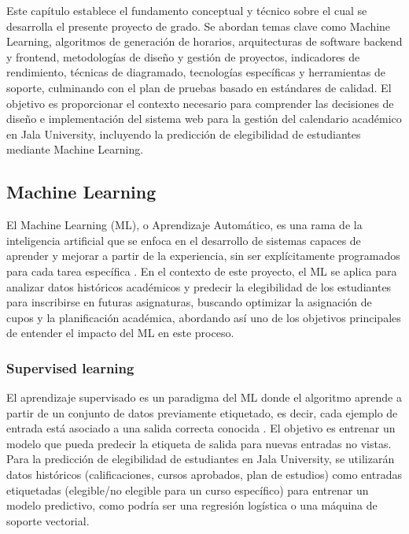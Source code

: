 Este capítulo establece el fundamento conceptual y técnico sobre el cual se desarrolla el presente proyecto de grado. Se abordan temas clave como Machine Learning, algoritmos de generación de horarios, arquitecturas de software backend y frontend, metodologías de diseño y gestión de proyectos, indicadores de rendimiento, técnicas de diagramado, tecnologías específicas y herramientas de soporte, culminando con el plan de pruebas basado en estándares de calidad. El objetivo es proporcionar el contexto necesario para comprender las decisiones de diseño e implementación del sistema web para la gestión del calendario académico en Jala University, incluyendo la predicción de elegibilidad de estudiantes mediante Machine Learning.

\subsection{Machine Learning}
El Machine Learning (ML), o Aprendizaje Automático, es una rama de la inteligencia artificial que se enfoca en el desarrollo de sistemas capaces de aprender y mejorar a partir de la experiencia, sin ser explícitamente programados para cada tarea específica \parencite{Samuel1959}. En el contexto de este proyecto, el ML se aplica para analizar datos históricos académicos y predecir la elegibilidad de los estudiantes para inscribirse en futuras asignaturas, buscando optimizar la asignación de cupos y la planificación académica, abordando así uno de los objetivos principales de entender el impacto del ML en este proceso.

\subsubsection{Supervised learning}
El aprendizaje supervisado es un paradigma del ML donde el algoritmo aprende a partir de un conjunto de datos previamente etiquetado, es decir, cada ejemplo de entrada está asociado a una salida correcta conocida \parencite{Bishop2006}. El objetivo es entrenar un modelo que pueda predecir la etiqueta de salida para nuevas entradas no vistas. Para la predicción de elegibilidad de estudiantes en Jala University, se utilizarán datos históricos (calificaciones, cursos aprobados, plan de estudios) como entradas etiquetadas (elegible/no elegible para un curso específico) para entrenar un modelo predictivo, como podría ser una regresión logística o una máquina de soporte vectorial.

